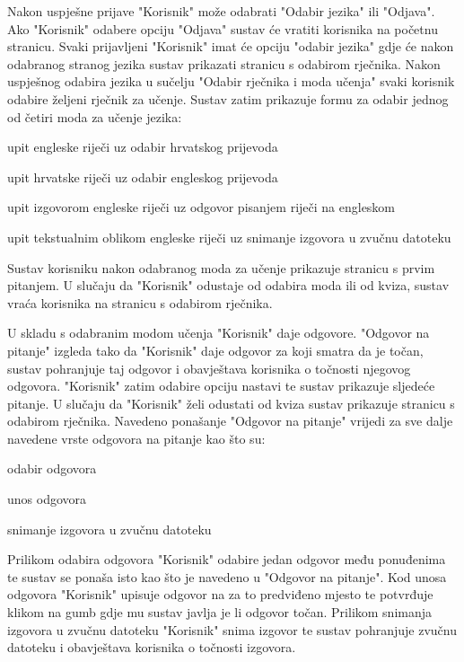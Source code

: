 Nakon uspješne prijave "Korisnik" može odabrati "Odabir jezika" ili "Odjava".
Ako "Korisnik" odabere opciju "Odjava" sustav će vratiti korisnika na početnu stranicu. Svaki prijavljeni "Korisnik" imat će opciju "odabir jezika" gdje će nakon odabranog stranog jezika sustav prikazati stranicu s odabirom rječnika.
Nakon uspješnog odabira jezika u sučelju "Odabir rječnika i moda učenja" svaki korisnik odabire željeni rječnik za učenje. Sustav zatim prikazuje formu za odabir jednog od četiri moda za učenje jezika: 

\begin{packed_item}
	\item  upit engleske riječi uz odabir hrvatskog prijevoda
	\item  upit hrvatske riječi uz odabir engleskog prijevoda
	\item  upit izgovorom engleske riječi uz odgovor pisanjem riječi na engleskom
	\item  upit tekstualnim oblikom engleske riječi uz snimanje izgovora u zvučnu datoteku
\end{packed_item}

Sustav korisniku nakon odabranog moda za učenje prikazuje stranicu s prvim pitanjem. U slučaju da "Korisnik" odustaje od odabira moda ili od kviza, sustav vraća korisnika na stranicu s odabirom rječnika.

U skladu s odabranim modom učenja "Korisnik" daje odgovore. "Odgovor na pitanje" izgleda tako da "Korisnik" daje odgovor za koji smatra da je točan, sustav pohranjuje taj odgovor i obavještava korisnika o točnosti njegovog odgovora. "Korisnik" zatim odabire opciju nastavi te sustav prikazuje sljedeće pitanje. U slučaju da "Korisnik" želi odustati od kviza sustav prikazuje stranicu s odabirom rječnika. Navedeno ponašanje "Odgovor na pitanje" vrijedi za sve dalje navedene vrste odgovora na pitanje kao što su:

\begin{packed_item}
	\item  odabir odgovora
	\item  unos odgovora
	\item  snimanje izgovora u zvučnu datoteku
\end{packed_item}

Prilikom odabira odgovora "Korisnik" odabire jedan odgovor među ponuđenima te sustav se ponaša isto kao što je navedeno u "Odgovor na pitanje". Kod unosa odgovora "Korisnik" upisuje odgovor na za to predviđeno mjesto te potvrđuje klikom na gumb gdje mu sustav javlja je li odgovor točan. Prilikom snimanja izgovora u zvučnu datoteku "Korisnik" snima izgovor te sustav pohranjuje zvučnu datoteku i obavještava korisnika o točnosti izgovora.

